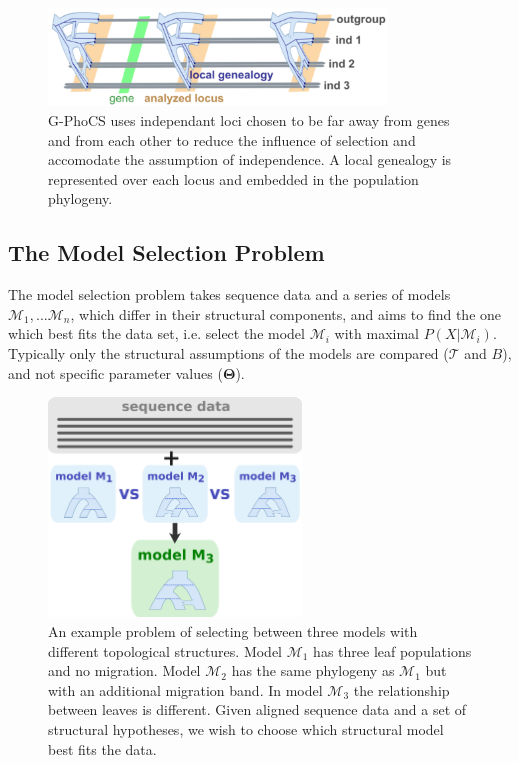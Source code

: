 \documentclass[11pt]{article}
\newcommand{\vect}[1]{\boldsymbol{\mathbf{#1}}}
\newcommand{\M}{\mathcal{M}}
\newcommand{\Tr}{\mathcal{T}}
\newcommand{\T}{\vect{\Theta}}
\newcommand{\1}{\mathbbm{1}}
\newcommand{\gp}{G-PhoCS }
\begin{document}
\begin{figure}[h]
\centering
\includegraphics[width=0.8\textwidth]
{multiple_loci_across_sequence}
\captionsetup{width=.8\textwidth}
\caption{\gp uses independant loci chosen to be far away from genes and from each other to reduce the influence of selection and accomodate the assumption of independence. A local genealogy is represented over each locus and embedded in the population phylogeny.}
\label{fig:multiple_loci_across_sequence}
\end{figure}


\subsection{The Model Selection Problem} \label{The Model Selection Problem}

The model selection problem takes sequence data and a series of models $\M_1,... \M_n$, which differ in their structural components, and aims to find the one which best fits the data set, i.e. select the model $\M_i$ with maximal $P(X|\M_i)$. Typically only the structural assumptions of the models are compared ($\Tr$ and $B$), and not specific parameter values ($\T$).


\begin{figure}[h]
\centering
\includegraphics[width=0.6\textwidth]
{by_ilan/probgen_3_model_selection}
\captionsetup{width=.8\textwidth}
\caption{An example problem of selecting between three models with different topological structures. Model $\M_1$ has three leaf populations and no migration. Model $\M_2$ has the same phylogeny as $\M_1$ but with an additional migration band. In model $\M_3$ the relationship between leaves is different. 
%
Given aligned sequence data and a set of structural hypotheses, we wish to choose which structural model best fits the data.}
\label{fig:model_A__OR__model_b}
\end{figure}
\end{document}
